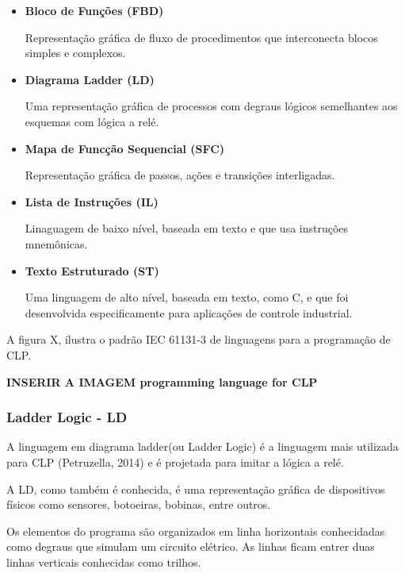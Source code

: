 \documentclass[a4paper, 12pt]{article}
\begin{document}
		\begin{itemize}
			\item \textbf{Bloco de Funções (FBD)}
			
				Representação gráfica de fluxo de procedimentos que interconecta blocos simples
				e complexos.
				
			\item \textbf{Diagrama Ladder (LD)}
			
				Uma representação gráfica de processos com degraus lógicos semelhantes aos esquemas
				com lógica a relé.
				
			\item \textbf{Mapa de Funcção Sequencial (SFC)}
			
				Representação gráfica de passos, ações e transições interligadas.
				
			\item \textbf{Lista de Instruções (IL)}
			
				Linaguagem de baixo nível, baseada em texto e que usa instruções mnemônicas.
				
			\item \textbf{Texto Estruturado (ST)}
			
				Uma linguagem de alto nível, baseada em texto, como C, e que foi desenvolvida
				especificamente para aplicações de controle industrial.
				
		\end{itemize}
		
		A figura X, ilustra o padrão IEC 61131-3 de linguagens para a programação de CLP.

		\textbf{INSERIR A IMAGEM programming language for CLP}
		
		\subsubsection{Ladder Logic - LD}
		
			A linguagem em diagrama ladder(ou Ladder Logic) é a linguagem mais utilizada para CLP (Petruzella, 2014)
			e é projetada para imitar a lógica a relé.
		
			A LD, como também é conhecida, é uma representação gráfica de dispositivos físicos
			como sensores, botoeiras, bobinas, entre outros.
			
			Os elementos do programa são organizados em linha horizontais conhecidadas como
			degraus que simulam um circuito elétrico. As linhas ficam entrer duas linhas
			verticais conhecidas como trilhos.
			
\end{document}

